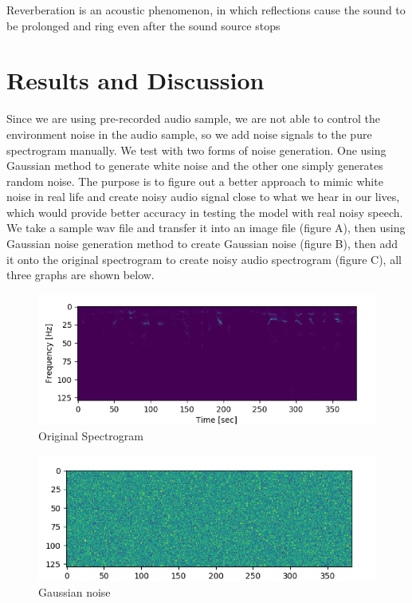 \documentclass[runningheads,a4paper]{llncs}
\begin{document}
Reverberation is an acoustic phenomenon, in which reflections cause the sound to be prolonged and ring even after the sound source stops \cite{24}




\section{Results and Discussion}
Since we are using pre-recorded audio sample, we are not able to control the environment noise in the audio sample, so we add noise signals to the pure spectrogram manually. We test with two forms of noise generation. One using Gaussian method to generate white noise and the other one simply generates random noise. The purpose is to figure out a better approach to mimic white noise in real life and create noisy audio signal close to what we hear in our lives, which would provide better accuracy in testing the model with real noisy speech.\\

We take a sample wav file and transfer it into an image file (figure A), then using Gaussian noise generation method to create Gaussian noise (figure B), then add it onto the original spectrogram to create noisy audio spectrogram (figure C), all three graphs are shown below.\\

\begin{figure}[H]
\includegraphics[scale=0.25]{figureA.png}
\caption{Original Spectrogram}
\label{fig:framework}
\end{figure}

\begin{figure}[H]
\includegraphics[scale=0.25]{figureB.png}
\caption{Gaussian noise}
\label{fig:framework}
\end{figure}
\end{document}
